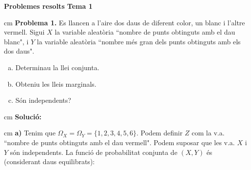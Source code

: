 \documentclass{article}
\begin{document}
\begin{center}
\textbf{Problemes resolts Tema 1}
\end{center}

 cm
\noindent
\textbf{Problema 1.}
Es llancen a l'aire dos daus de diferent color, un blanc i
l'altre vermell. Sigui $X$ la variable aleat\`oria ``nombre de punts
obtinguts amb el dau blanc", i $Y$ la variable aleat\`oria ``nombre
m\'es gran dels punts obtinguts amb els dos daus".
\begin{enumerate}[a)]
\item Determinau la llei conjunta.
\item Obteniu les lleis marginals.
\item S\'on independents? 
\end{enumerate}

 cm
\noindent
\textbf{Soluci\'o:}

 cm
\noindent
\textbf{a)} Tenim que $\Omega_X=\Omega_Y=\{ 1, 2, 3, 4, 5, 6 \}$. Podem definir $Z$ com la
v.a. ``nombre de punts obtinguts amb el dau vermell". Podem suposar que les v.a. $X$ i $Y$ s\'on independents.
La funci\'o de probabilitat conjunta de $(X, Y)$ \'es (considerant daus equilibrats):
\end{document}

